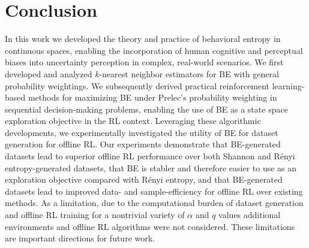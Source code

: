 \section{Conclusion}

In this work we developed the theory and practice of behavioral entropy in continuous spaces, enabling the incorporation of human cognitive and perceptual biases into uncertainty perception in complex, real-world scenarios. We first developed and analyzed $k$-nearest neighbor estimators for BE with general probability weightings. We subsequently derived practical reinforcement learning-based methods for maximizing BE under Prelec's probability weighting in sequential decision-making problems, enabling the use of BE as a state space exploration objective in the RL context. Leveraging these algorithmic developments, we experimentally investigated the utility of BE for dataset generation for offline RL. Our experiments demonstrate that BE-generated datasets lead to superior offline RL performance over both Shannon and R\'{e}nyi entropy-generated datasets, that BE is stabler and therefore easier to use as an exploration objective compared with R\'{e}nyi entropy, and that BE-generated datasets lead to improved data- and sample-efficiency for offline RL over existing methods.
%
As a limitation, due to the computational burden of dataset generation and offline RL training for a nontrivial variety of $\alpha$ and $q$ values additional environments and offline RL algorithms were not considered. These limitations are important directions for future work.